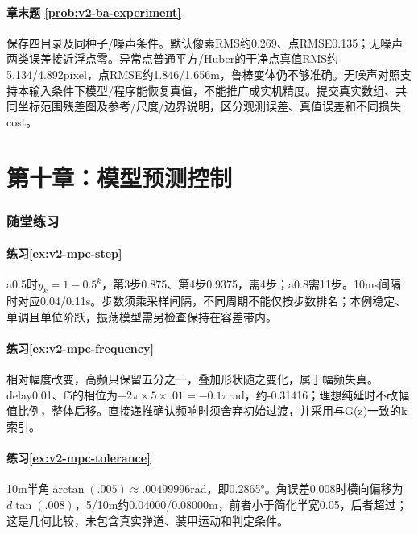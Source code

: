 \paragraph*{章末题 \ref{prob:v2-ba-experiment}}
\begin{solution}
保存四目录及同种子/噪声条件。默认像素RMS约0.269、点RMSE0.135；无噪声两类误差接近浮点零。异常点普通平方/Huber的干净点真值RMS约5.134/4.892pixel，点RMSE约1.846/1.656m，鲁棒变体仍不够准确。无噪声对照支持本输入条件下模型/程序能恢复真值，不能推广成实机精度。提交真实数组、共同坐标范围残差图及参考/尺度/边界说明，区分观测误差、真值误差和不同损失cost。
\end{solution}

\section*{第十章：模型预测控制}
{}
\subsubsection*{随堂练习}

\paragraph*{练习\ref{ex:v2-mpc-step}}
\begin{solution}
a0.5时$y_k=1-0.5^k$，第3步0.875、第4步0.9375，需4步；a0.8需11步。10ms间隔时对应0.04/0.11s。步数须乘采样间隔，不同周期不能仅按步数排名；本例稳定、单调且单位阶跃，振荡模型需另检查保持在容差带内。
\end{solution}
\paragraph*{练习\ref{ex:v2-mpc-frequency}}
\begin{solution}
相对幅度改变，高频只保留五分之一，叠加形状随之变化，属于幅频失真。delay0.01、f5的相位为$-2\pi\times5\times.01=-0.1\pi$rad，约-0.31416；理想纯延时不改幅值比例，整体后移。直接递推确认频响时须舍弃初始过渡，并采用与G(z)一致的k索引。
\end{solution}
\paragraph*{练习\ref{ex:v2-mpc-tolerance}}
\begin{solution}
10m半角$\arctan(.005)\approx.00499996$rad，即0.2865°。角误差0.008时横向偏移为$d\tan(.008)$，5/10m约0.04000/0.08000m，前者小于简化半宽0.05，后者超过；这是几何比较，未包含真实弹道、装甲运动和判定条件。
\end{solution}
